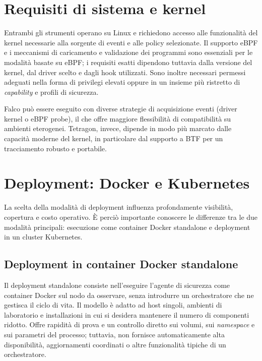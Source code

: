 \documentclass[12pt,a4paper,openright,twoside]{book}
\begin{document}
\section{Requisiti di sistema e kernel}
\label{sec:system-kernel-requirements}
Entrambi gli strumenti operano su Linux e richiedono accesso alle funzionalità del kernel necessarie alla sorgente di eventi e alle policy selezionate. Il supporto eBPF e i meccanismi di caricamento e validazione dei programmi sono essenziali per le modalità basate su eBPF; i requisiti esatti dipendono tuttavia dalla versione del kernel, dal driver scelto e dagli hook utilizzati. Sono inoltre necessari permessi adeguati nella forma di privilegi elevati oppure in un insieme più ristretto di \textit{capability} e profili di sicurezza. \cite{falco-docs-setup,falco-docs-kernel,tetragon-docs-install,tetragon-docs-install-faq}

Falco può essere eseguito con diverse strategie di acquisizione eventi (driver kernel o eBPF probe), il che offre maggiore flessibilità di compatibilità su ambienti eterogenei.
Tetragon, invece, dipende in modo più marcato dalle capacità moderne del kernel, in particolare dal supporto a BTF per un tracciamento robusto e portabile. \cite{falco-docs-kernel,tetragon-docs-hooks,tetragon-docs-install-faq}

\section{Deployment: Docker e Kubernetes}
\label{sec:deployment-models}

La scelta della modalità di deployment influenza profondamente visibilità, copertura e costo operativo. È perciò importante conoscere le differenze tra le due modalità principali: esecuzione come container Docker standalone e deployment in un cluster Kubernetes.

\subsection{Deployment in container Docker standalone}
Il deployment standalone consiste nell'eseguire l'agente di sicurezza come container Docker sul nodo da osservare, senza introdurre un orchestratore che ne gestisca il ciclo di vita. Il modello è adatto ad host singoli, ambienti di laboratorio e installazioni in cui si desidera mantenere il numero di componenti ridotto. Offre rapidità di prova e un controllo diretto sui volumi, sui \textit{namespace} e sui parametri del processo; tuttavia, non fornisce automaticamente alta disponibilità, aggiornamenti coordinati o altre funzionalità tipiche di un orchestratore.
\end{document}
